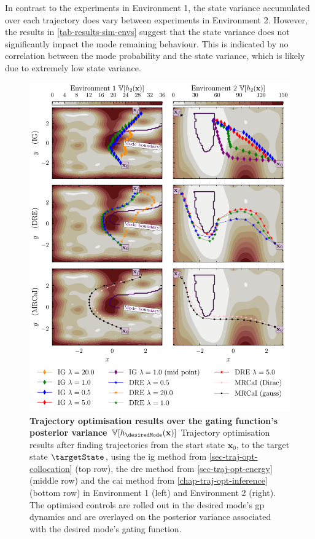 \documentclass{mimosis-class/mimosis}
\numberwithin{equation}{chapter}
\newcommand{\state}{\ensuremath{\mathbf{x}}}
\begin{document}
{In contrast to the experiments in Environment 1, the state variance accumulated over each trajectory does vary
between experiments in Environment 2.
However, the results in  \cref{tab-results-sim-envs} suggest that the state variance does not significantly impact
the mode remaining behaviour.
This is indicated by no correlation between the mode probability and the state variance,
which is likely due to extremely low state variance.
\begin{figure}
\centering
\includegraphics[width=\textwidth]{./images/mode-opt/trajectory_optimisation/all_trajectories_over_gating_variance_both_scenarios.pdf}
\caption[Trajectory optimisation results over the gating function's posterior variance]{\textbf{Trajectory optimisation results over the gating function's posterior variance $\mathbb{V}[h_{\desiredMode}(\state)]$}
Trajectory optimisation results after finding trajectories from the start state $\state_0$,
to the target state $\targetState$, using the \acrfull{ig} method
from \cref{sec-traj-opt-collocation}
(top row), the \acrfull{dre} method from \cref{sec-traj-opt-energy} (middle row) and the
\acrfull{cai} method from \cref{chap-traj-opt-inference} (bottom row) in Environment 1 (left)
and Environment 2 (right).
The optimised controls are rolled out in the desired mode's \acrshort{gp} dynamics and are overlayed on the
posterior variance associated with the desired mode's gating function.}
\label{fig-all-traj-opt-variance}
\end{figure}
\newline

}
\end{document}
